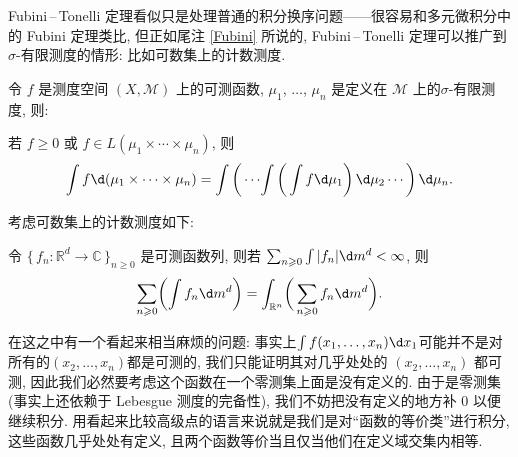 \begin{alterendnote}
    Fubini\,--\,Tonelli 定理看似只是处理普通的积分换序问题------很容易和多元微积分中的 Fubini 定理类比, 但正如尾注 \ref{Fubini} 所说的, Fubini\,--\,Tonelli 定理可以推广到\;$\sigma $-有限测度的情形: 比如可数集上的计数测度.
    \begin{theorem}
        令 $f$ 是测度空间 $(X,\mathcal M)$ 上的可测函数, $\mu _1$, $\dots $, $\mu _n$ 是定义在 $\mathcal M$ 上的\;$\sigma $-有限测度, 则:

        若 $f\geqslant 0$ 或 $f\in L(\mu_1 \times \cdots \times \mu _n)$, 则
        \[
            \int f \d (\mu_1\times \cdots \times \mu _n) = \int\left(\,\cdots \!\int\left(\, \int f \d \mu_1 \right) \d \mu_2\cdots \right)\d \mu_n
            .\]
    \end{theorem}
    考虑可数集上的计数测度如下:
    \begin{theorem}
        令 $\{\,f_n: \mathbb R^d\to \mathbb C\,\}_{n\geqslant 0}$ 是可测函数列, 则若 $\sum_{n\geqslant 0}\int |f_n|\d m^d<\infty$, 则
        \[
            \sum_{n\geqslant 0}\biggl(\int f_n\d m^d\biggr) = \int_{\mathbb R^n}\biggl(\,\sum_{n\geqslant 0} f_n\d m^d\biggr)
            .\]
    \end{theorem}
\end{alterendnote}
\begin{alterendnote}
    在这之中有一个看起来相当麻烦的问题: 事实上$\int f(x_1,\dots,x_n)\d x_1$可能并不是对所有的$(x_2,\dots,x_n)$都是可测的, 我们只能证明其对几乎处处的 $(x_2,\dots,x_n)$ 都可测, 因此我们必然要考虑这个函数在一个零测集上面是没有定义的. 由于是零测集(事实上还依赖于 Lebesgue 测度的完备性), 我们不妨把没有定义的地方补 $0$ 以便继续积分. 用看起来比较高级点的语言来说就是我们是对``函数的等价类''进行积分, 这些函数几乎处处有定义, 且两个函数等价当且仅当他们在定义域交集内相等.
\end{alterendnote}
